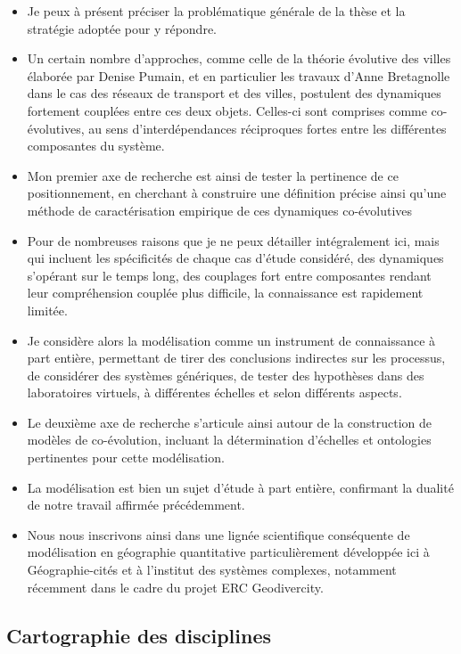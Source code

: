 \documentclass[12pt]{article}
\begin{document}
\begin{itemize}
	\item Je peux à présent préciser la problématique générale de la thèse et la stratégie adoptée pour y répondre.
	\item Un certain nombre d'approches, comme celle de la théorie évolutive des villes élaborée par Denise Pumain, et en particulier les travaux d'Anne Bretagnolle dans le cas des réseaux de transport et des villes, postulent des dynamiques fortement couplées entre ces deux objets. Celles-ci sont comprises comme co-évolutives, au sens d'interdépendances réciproques fortes entre les différentes composantes du système.
	\item Mon premier axe de recherche est ainsi de tester la pertinence de ce positionnement, en cherchant à construire une définition précise ainsi qu'une méthode de caractérisation empirique de ces dynamiques co-évolutives
	\item Pour de nombreuses raisons que je ne peux détailler intégralement ici, mais qui incluent les spécificités de chaque cas d'étude considéré, des dynamiques s'opérant sur le temps long, des couplages fort entre composantes rendant leur compréhension couplée plus difficile, la connaissance est rapidement limitée.
	\item Je considère alors la modélisation comme un instrument de connaissance à part entière, permettant de tirer des conclusions indirectes sur les processus, de considérer des systèmes génériques, de tester des hypothèses dans des laboratoires virtuels, à différentes échelles et selon différents aspects.
	\item Le deuxième axe de recherche s'articule ainsi autour de la construction de modèles de co-évolution, incluant la détermination d'échelles et ontologies pertinentes pour cette modélisation.
	\item La modélisation est bien un sujet d'étude à part entière, confirmant la dualité de notre travail affirmée précédemment. 
	\item Nous nous inscrivons ainsi dans une lignée scientifique conséquente de modélisation en géographie quantitative particulièrement développée ici à Géographie-cités et à l'institut des systèmes complexes, notamment récemment dans le cadre du projet ERC Geodivercity.
\end{itemize}

\newpage


\subsection*{Cartographie des disciplines}
\end{document}
